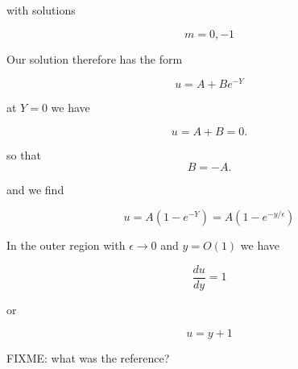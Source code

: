 with solutions

\begin{equation}\label{eqn:continuumL20:n}
m = 0, -1
\end{equation}

Our solution therefore has the form

\begin{equation}\label{eqn:continuumL20:n}
u = A + B e^{-Y}
\end{equation}

at $Y = 0$ we have

\begin{equation}\label{eqn:continuumL20:n}
u = A + B = 0.
\end{equation}

so that 
\begin{equation}\label{eqn:continuumL20:n}
B = -A.
\end{equation}

and we find

\begin{equation}\label{eqn:continuumL20:n}
u = A (1 - e^{-Y}) = A( 1 - e^{-y/\epsilon} )
\end{equation}

In the outer region with $\epsilon \rightarrow 0$ and $y = O(1)$ we have

\begin{equation}\label{eqn:continuumL20:n}
\frac{du}{dy} = 1
\end{equation}

or 

\begin{equation}\label{eqn:continuumL20:n}
u = y + 1
\end{equation}

%
%

FIXME: what was the reference?

\EndNoBibArticle
